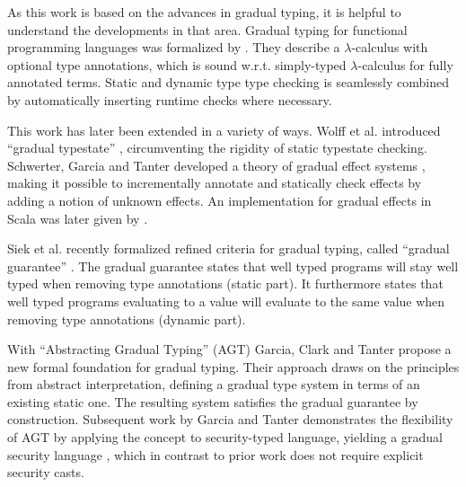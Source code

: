 As this work is based on the advances in gradual typing, it is helpful to understand the developments in that area.
Gradual typing for functional programming languages was formalized by \cite{siek2006gradual}.
They describe a $\lambda$-calculus with optional type annotations, which is sound w.r.t. simply-typed $\lambda$-calculus for fully annotated terms.
Static and dynamic type type checking is seamlessly combined by automatically inserting runtime checks where necessary.

This work has later been extended in a variety of ways.
Wolff et al. introduced “gradual typestate” \cite{wolff2011gradual}, circumventing the rigidity of static typestate checking.
Schwerter, Garcia and Tanter developed a theory of gradual effect systems \cite{banados2014theory}, making it possible to incrementally annotate and statically check effects by adding a notion of unknown effects.
An implementation for gradual effects in Scala was later given by \cite{toro2015customizable}.

\label{grad-guarantee}
Siek et al. recently formalized refined criteria for gradual typing, called “gradual guarantee” \cite{siek2015refined}.
The gradual guarantee states that well typed programs will stay well typed when removing type annotations (static part).
It furthermore states that well typed programs evaluating to a value will evaluate to the same value when removing type annotations (dynamic part).


With “Abstracting Gradual Typing” (AGT) \cite{garcia2016abstracting} Garcia, Clark and Tanter propose a new formal foundation for gradual typing.
Their approach draws on the principles from abstract interpretation, defining a gradual type system in terms of an existing static one.
The resulting system satisfies the gradual guarantee by construction.
Subsequent work by Garcia and Tanter demonstrates the flexibility of AGT by applying the concept to security-typed language, yielding a gradual security language \cite{garcia2015deriving}, which in contrast to prior work does not require explicit security casts.
